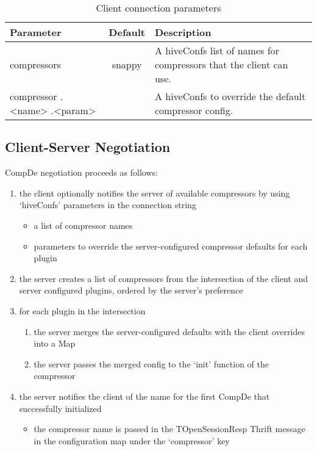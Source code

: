 \documentclass[11pt,a4paper]{article}
\begin{document}
		\begin{table}[H]
			\begin{tabular}{| p{3cm} | c | p{6.5cm} |} \hline
				
				\textbf{Parameter} & \textbf{Default} & \textbf{Description} \\ \hline
				compressors
				& snappy
				& A hiveConfs list of names for compressors that the client can use. 
				\\ \hline
				
				compressor\linebreak
				.\textless name\textgreater\linebreak
				.\textless param\textgreater
				&
				& A hiveConfs to override the default compressor config. 
				\\ \hline
				
			\end{tabular}
			\caption{Client connection parameters}
		\end{table}
		
	\subsection{Client-Server Negotiation}
		
		CompDe negotiation proceeds as follows:
		
		\begin{enumerate}
			
			\item the client optionally notifies the server of available compressors by using `hiveConfs' parameters in the connection string
			\begin{itemize}
				\item a list of compressor names
				\item parameters to override the server-configured compressor defaults for each plugin
			\end{itemize}
			
			\item the server creates a list of compressors from the intersection of the client and server configured plugins, ordered by the server's preference
			
			\item for each plugin in the intersection
			\begin{enumerate}[1.]
				\item the server merges the server-configured defaults with the client overrides into a Map
				\item the server passes the merged config to the `init' function of the compressor
			\end{enumerate}
			
			\item the server notifies the client of the name for the first CompDe that successfully initialized
			\begin{itemize}
				\item the compressor name is passed in the TOpenSessionResp Thrift message in the configuration map under the `compressor' key
			\end{itemize}
		\end{enumerate}
		
\end{document}
